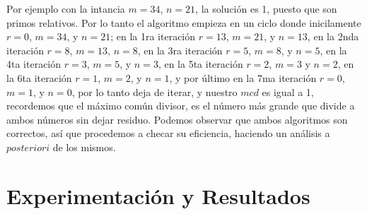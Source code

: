 \documentclass[12pt,twoside]{article}
\begin{document}
Por ejemplo con la intancia $m=34$, $n=21$, la soluci\'on es 1, puesto que son primos relativos. Por lo tanto el algoritmo empieza en un ciclo donde inicilamente $r=0$, $m=34$, y $n=21$; en la 1ra iteraci\'on $r=13$, $m=21$, y $n=13$, en la 2nda iteraci\'on $r=8$, $m=13$, $n=8$, en la 3ra iteraci\'on $r=5$, $m=8$, y $n=5$, en la 4ta iteraci\'on $r=3$, $m=5$, y $n=3$, en la 5ta iteraci\'on $r=2$, $m=3$ y $n=2$, en la 6ta iteraci\'on $r=1$, $m=2$, y $n=1$, y por \'ultimo en la 7ma iteraci\'on $r=0$, $m=1$, y $n=0$, por lo tanto deja de iterar, y nuestro $mcd$ es igual a 1, recordemos que el m\'aximo com\'un divisor, es el n\'umero m\'as grande que divide a ambos n\'umeros sin dejar residuo.
\newline
\newline 
Podemos observar que ambos algoritmos son correctos, as\'i que procedemos a checar su eficiencia, haciendo un an\'alisis a $posteriori$ de los mismos.

\section{Experimentaci\'on y Resultados}
\end{document}
